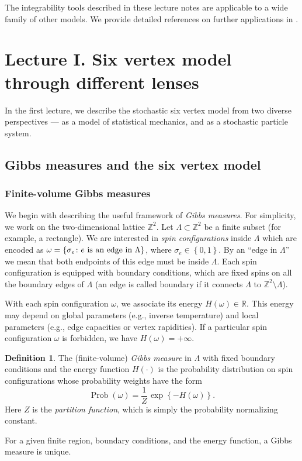 \documentclass[letterpaper,11pt,oneside,reqno]{article}
\numberwithin{equation}{section}
\newcommand{\ssp}{\hspace{1pt}}
\theoremstyle{definition}
\newtheorem{definition}[proposition]{Definition}
\theoremstyle{remark}
\begin{document}
The integrability tools described in these lecture notes are applicable to a wide family of other models. We provide detailed references on further applications in .








\newpage
\section{Lecture I. Six vertex model through different lenses}
\label{sec:6v_model_lecture}

In the first lecture, we describe the stochastic six vertex model
from two diverse perspectives --- as a model of statistical mechanics,
and as a stochastic particle system.

\subsection{Gibbs measures and the six vertex model}
\label{sub:gibbs_6v}

\subsubsection{Finite-volume Gibbs measures}

We begin with describing the useful framework of \emph{Gibbs measures}.
For simplicity, we work on the two-dimensional lattice $\mathbb{Z}^2$.
Let $\Lambda\subset\mathbb{Z}^{2}$ be a finite subset (for example, a rectangle).
We are interested in \emph{spin configurations} inside $\Lambda$
which are encoded as $\omega=\{\sigma_e\colon e \textnormal{ is an edge in $\Lambda$}\}$,
where $\sigma_e\in\left\{ 0,1 \right\}$.
By an ``edge in $\Lambda$'' we mean that both endpoints of this edge must be inside $\Lambda$.
Each spin configuration is equipped with boundary conditions,
which are fixed spins on all the boundary edges of $\Lambda$
(an edge is called boundary if it connects $\Lambda$ to $\mathbb{Z}^{2}\setminus \Lambda$).

With each spin configuration $\omega$, we associate 
its energy
$H(\omega)\in \mathbb{R}$.
This energy
may depend on global parameters
(e.g., inverse temperature)
and local parameters (e.g., edge capacities or vertex rapidities).
If a particular spin configuration $\omega$ is forbidden, we have $H(\omega)=+\infty$.

\begin{definition}
	\label{def:Gibbs_measure_finite}
	The (finite-volume) \emph{Gibbs measure}
	in $\Lambda$ 
	with fixed boundary conditions 
	and the energy function $H(\cdot)$
	is the probability distribution on spin configurations 
	whose probability weights have the form
	\begin{equation*}
		\mathop{\mathrm{{Prob}}}(\omega)=\frac{1}{Z}\ssp\exp\left\{ -H(\omega) \right\}.
	\end{equation*}
	Here $Z$ is the \emph{partition function}, which is simply the probability normalizing constant.
\end{definition}
For a given finite region, boundary conditions, and the energy function, a 
Gibbs measure is unique.
\end{document}
